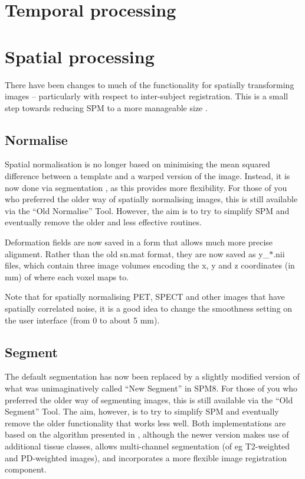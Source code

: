 \documentclass[a4paper,titlepage,openany]{article}
\begin{document}

\vspace{10mm}
\begin{multicols}{2}

\section{Temporal processing}

\section{Spatial processing}
There have been changes to much of the functionality for spatially transforming images -- particularly with respect to inter-subject registration.
This is a small step towards reducing SPM to a more manageable size \cite{ashburner2011spm}.

\subsection{Normalise}
Spatial normalisation is no longer based on minimising the mean squared difference between a template and a warped version of the image.
Instead, it is now done via segmentation \cite{ashburner05}, as this provides more flexibility.
For those of you who preferred the older way of spatially normalising images, this is still available via the ``Old Normalise'' Tool.
However, the aim is to try to simplify SPM and eventually remove the older and less effective \cite{klein_evaluation} routines.

Deformation fields are now saved in a form that allows much more precise alignment.
Rather than the old sn.mat format, they are now saved as y\_$*$.nii files, which contain three image volumes encoding the x, y and z coordinates (in mm) of where each voxel maps to.

Note that for spatially normalising PET, SPECT and other images that have spatially correlated noise, it is a good idea to change the smoothness setting on the user interface (from 0 to about 5 mm).

\subsection{Segment}
The default segmentation has now been replaced by a slightly modified version of what was unimaginatively called ``New Segment'' in SPM8.
For those of you who preferred the older way of segmenting images, this is still available via the ``Old Segment'' Tool.
The aim, however, is to try to simplify SPM and eventually remove the older functionality that works less well.
Both implementations are based on the algorithm presented in \cite{ashburner05}, although the newer version makes use of additional tissue classes, allows multi-channel segmentation (of eg T2-weighted and PD-weighted images), and incorporates a more flexible image registration component.


\end{multicols}
\end{document}
